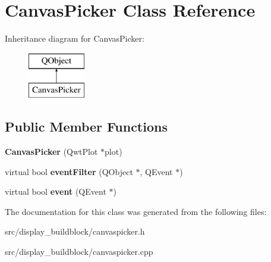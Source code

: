 \hypertarget{classCanvasPicker}{}\section{Canvas\+Picker Class Reference}
\label{classCanvasPicker}
Inheritance diagram for Canvas\+Picker\+:\begin{figure}[H]
\begin{center}
\leavevmode
\includegraphics[height=2.000000cm]{classCanvasPicker}
\end{center}
\end{figure}
\subsection*{Public Member Functions}
\begin{DoxyCompactItemize}
\item 
\mbox{\label{classCanvasPicker_a1f63183524af385cc42ef0f16a273a87}} 
{\bfseries Canvas\+Picker} (Qwt\+Plot $\ast$plot)
\item 
\mbox{\label{classCanvasPicker_a5214f5f57985d9a4c32ed4c97359da61}} 
virtual bool {\bfseries event\+Filter} (Q\+Object $\ast$, Q\+Event $\ast$)
\item 
\mbox{\label{classCanvasPicker_a270dbff23f04e8338d9e07b045b845d1}} 
virtual bool {\bfseries event} (Q\+Event $\ast$)
\end{DoxyCompactItemize}


The documentation for this class was generated from the following files\+:\begin{DoxyCompactItemize}
\item 
src/display\+\_\+buildblock/canvaspicker.\+h\item 
src/display\+\_\+buildblock/canvaspicker.\+cpp\end{DoxyCompactItemize}
